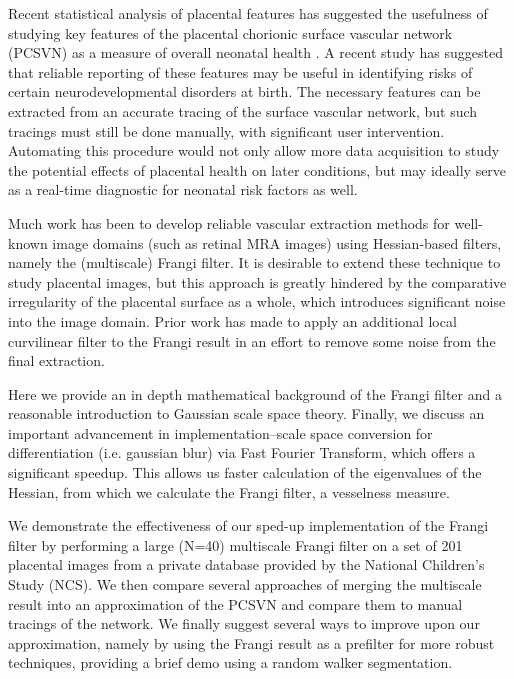 

Recent statistical analysis of placental features has suggested the usefulness of studying key features of the placental chorionic surface vascular network (PCSVN) as a measure of overall neonatal health \cite{chang2017}. A recent study has suggested that reliable reporting of these features may be useful in identifying risks of certain neurodevelopmental disorders at birth. The necessary features can be extracted from an accurate tracing of the surface vascular network, but such tracings must still be done manually, with significant user intervention. Automating this procedure would not only allow more data acquisition to study the potential effects of placental health on later conditions, but may ideally serve as a real-time diagnostic for neonatal risk factors as well.

Much work has been to develop reliable vascular extraction methods for well-known image domains (such as retinal MRA images) using Hessian-based filters, namely the (multiscale) Frangi filter. It is desirable to extend these technique to study placental images, but this approach is greatly hindered by the comparative irregularity of the placental surface as a whole, which introduces significant noise into the image domain.  Prior work \cite{huynh2013filter} has made to apply an additional local curvilinear filter to the Frangi result in an effort to remove some noise from the final extraction.

Here we provide an in depth mathematical background of the Frangi filter and a reasonable introduction to Gaussian scale space theory. Finally, we discuss an important advancement in implementation--scale space conversion for differentiation (i.e. gaussian blur) via Fast Fourier Transform, which offers a significant speedup. This allows us faster calculation of the eigenvalues of the Hessian, from which we calculate the Frangi filter, a vesselness measure.

We demonstrate the effectiveness of our sped-up implementation of the Frangi filter by performing a large (N=40) multiscale Frangi filter on a set of 201 placental images from a private database provided by the National Children's Study (NCS). We then compare several approaches of merging the multiscale result into an approximation of the PCSVN and compare them to manual tracings of the network. We finally suggest several ways to improve upon our approximation, namely by using the Frangi result as a prefilter for more robust techniques, providing a brief demo using a random walker segmentation.


